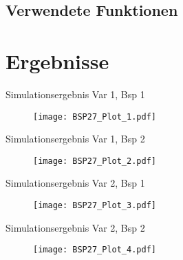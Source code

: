 \subsection{Verwendete Funktionen}
%

\section{Ergebnisse}
\begin{frame}[fragile]{Simulationsergebnis Var 1, Bsp 1}
    	\begin{figure}[h!]
    	\texttt{[image: BSP27\_Plot\_1.pdf]}
		\end{figure}
\end{frame}

\begin{frame}[fragile]{Simulationsergebnis Var 1, Bsp 2}
    	\begin{figure}[h!]
    	\texttt{[image: BSP27\_Plot\_2.pdf]}
		\end{figure}
\end{frame}

\begin{frame}[fragile]{Simulationsergebnis Var 2, Bsp 1}
    	\begin{figure}[h!]
    	\texttt{[image: BSP27\_Plot\_3.pdf]}
		\end{figure}
\end{frame}

\begin{frame}[fragile]{Simulationsergebnis Var 2, Bsp 2}
    	\begin{figure}[h!]
    	\texttt{[image: BSP27\_Plot\_4.pdf]}
		\end{figure}
\end{frame}


